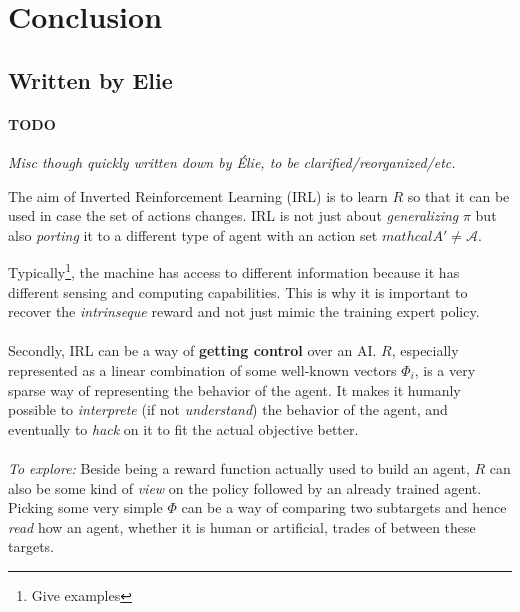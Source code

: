 \documentclass{article}
\begin{document}
\section{Conclusion}


\subsection{Written by Elie \label{sec:misc}}

\paragraph{TODO}
\emph{Misc though quickly written down by Élie, to be clarified/reorganized/etc.}

The aim of Inverted Reinforcement Learning (IRL) is to learn $R$ so that it can be used in case the set of actions changes. IRL is not just about \emph{generalizing} $\pi$ but also \emph{porting} it to a different type of agent with an action set $mathcal A' \neq \mathcal A$. %

Typically\footnote{Give examples}, the machine has access to different information because it has different sensing and computing capabilities. This is why it is important to recover the \emph{intrinseque} reward and not just mimic the training expert policy.

\paragraph{}
Secondly, IRL can be a way of \textbf{getting control} over an AI. $R$, especially represented as a linear combination of some well-known vectors $\Phi_i$, is a very sparse way of representing the behavior of the agent. It makes it humanly possible to \emph{interprete} (if not \emph{understand}) the behavior of the agent, and eventually to \emph{hack} on it to fit the actual objective better.

\paragraph{}
\emph{To explore:} Beside being a reward function actually used to build an agent, $R$ can also be some kind of \emph{view} on the policy followed by an already trained agent. Picking some very simple $\Phi$ can be a way of comparing two subtargets and hence \emph{read} how an agent, whether it is human or artificial, trades of between these targets.
\end{document}
